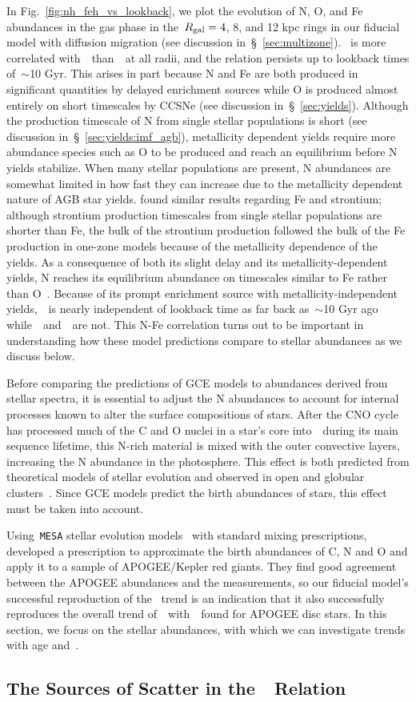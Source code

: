 \documentclass[ms.tex]{subfiles}
\begin{document}
In Fig.~\ref{fig:nh_feh_vs_lookback}, we plot the evolution of N, O, and Fe
abundances in the gas phase in the~$R_\text{gal} = 4$, 8, and 12 kpc rings in our
fiducial model with diffusion migration (see discussion
in~\S~\ref{sec:multizone}).
\nh~is more correlated with~\feh~than~\oh~at all radii, and the relation
persists up to lookback times of~$\sim$10 Gyr.
This arises in part because N and Fe are both produced in significant
quantities by delayed enrichment sources while O is produced almost entirely on
short timescales by CCSNe (see discussion in~\S~\ref{sec:yields}).
Although the production timescale of N from single stellar populations is
short (see discussion in~\S~\ref{sec:yields:imf_agb}), metallicity dependent
yields require more abundance species such as O to be produced and reach an
equilibrium before N yields stabilize.
When many stellar populations are present, N abundances are somewhat limited
in how fast they can increase due to the metallicity dependent nature of AGB
star yields.
\citet{Johnson2020} found similar results regarding Fe and strontium; although
strontium production timescales from single stellar populations are shorter
than Fe, the bulk of the strontium production followed the bulk of the Fe
production in one-zone models because of the metallicity dependence of the
yields.
As a consequence of both its slight delay and its metallicity-dependent
yields, N reaches its equilibrium abundance on timescales similar to Fe rather
than O~\citep{Weinberg2017}.
Because of its prompt enrichment source with metallicity-independent
yields,~\oh~is nearly independent of lookback time as far back as~$\sim$10 Gyr
ago while~\nh~and~\feh~are not.
This N-Fe correlation turns out to be important in understanding how these
model predictions compare to stellar abundances as we discuss below.
\par
Before comparing the predictions of GCE models to abundances derived from
stellar spectra, it is essential to adjust the N abundances to account for
internal processes known to alter the surface compositions of stars.
After the CNO cycle has processed much of the C and O nuclei in a star's core
into~\Nfourteen~during its main sequence lifetime, this N-rich material is
mixed with the outer convective layers, increasing the N abundance in the
photosphere.
This effect is both predicted from theoretical models of stellar evolution and
observed in open and globular clusters~\citep{Gilroy1989, Korn2007, Lind2008,
Souto2018, Souto2019}.
Since GCE models predict the birth abundances of stars, this effect must be
taken into account.
\par
Using~\texttt{MESA} stellar evolution models~\citep{Paxton2011, Paxton2013,
Paxton2015, Paxton2018} with standard mixing prescriptions,~\citet{Vincenzo2021}
developed a prescription to approximate the birth abundances of C, N and O
and apply it to a sample of APOGEE/Kepler red giants.
They find good agreement between the APOGEE abundances and the
\citet{Dopita2016} measurements, so our fiducial model's successful reproduction
of the~\citet{Dopita2016} trend is an indication that it also successfully
reproduces the overall trend of~\no~with~\oh~found for APOGEE disc stars.
In this section, we focus on the stellar abundances, with which we can
investigate trends with age and~\ofe.


\subsection{The Sources of Scatter in the~\ohno~Relation}
\label{sec:results:schaefer_comp}
\end{document}
